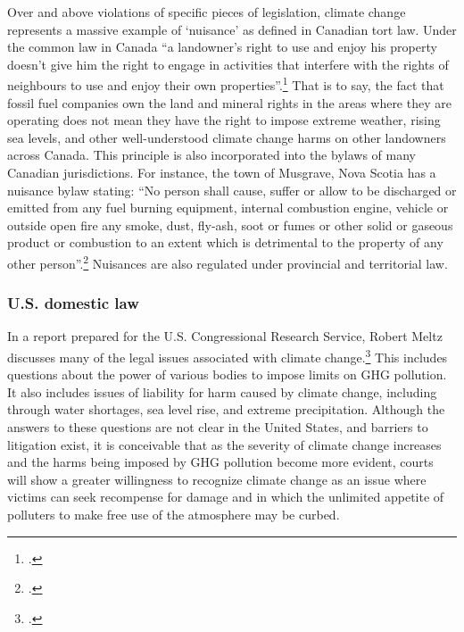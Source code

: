 Over and above violations of specific pieces of legislation, climate change represents a massive example of `nuisance' as defined in Canadian tort law.
Under the common law in Canada ``a landowner's right to use and enjoy his property doesn't give him the right to engage in activities that interfere with the rights of neighbours to use and enjoy their own properties''.\footcite[][]{NuisancesInsider}
That is to say, the fact that fossil fuel companies own the land and mineral rights in the areas where they are operating does not mean they have the right to impose extreme weather, rising sea levels, and other well-understood climate change harms on other landowners across Canada.
This principle is also incorporated into the bylaws of many Canadian jurisdictions.
For instance, the town of Musgrave, Nova Scotia has a nuisance bylaw stating: ``No person shall cause, suffer or allow to be discharged or emitted from any fuel burning equipment, internal combustion engine, vehicle or outside open fire any smoke, dust, fly-ash, soot or fumes or other solid or gaseous product or combustion to an extent which is detrimental to the property of any other person''.\footcite[][]{NuisancesInsider}
Nuisances are also regulated under provincial and territorial law.



		\subsubsection{U.S. domestic law}



In a report prepared for the U.S. Congressional Research Service, Robert Meltz discusses many of the legal issues associated with climate change.\footcite[][]{ExistingLaw}
This includes questions about the power of various bodies to impose limits on GHG pollution.
It also includes issues of liability for harm caused by climate change, including through water shortages, sea level rise, and extreme precipitation.
Although the answers to these questions are not clear in the United States, and barriers to litigation exist, it is conceivable that as the severity of climate change increases and the harms being imposed by GHG pollution become more evident, courts will show a greater willingness to recognize climate change as an issue where victims can seek recompense for damage and in which the unlimited appetite of polluters to make free use of the atmosphere may be curbed.



